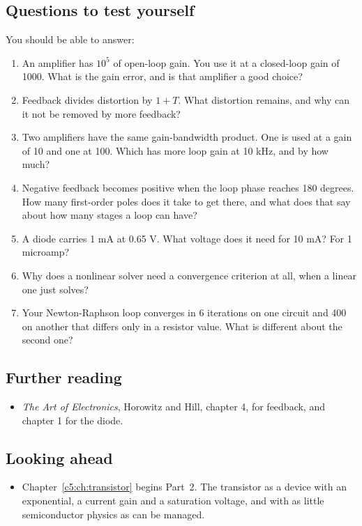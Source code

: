 \subsection*{Questions to test yourself}
You should be able to answer:
\begin{enumerate}
  \item An amplifier has $10^5$ of open-loop gain. You use it at a closed-loop gain of 1000. What is the gain error, and is that amplifier a good choice?
  \item Feedback divides distortion by $1 + T$. What distortion remains, and why can it not be removed by more feedback?
  \item Two amplifiers have the same gain-bandwidth product. One is used at a gain of 10 and one at 100. Which has more loop gain at 10 kHz, and by how much?
  \item Negative feedback becomes positive when the loop phase reaches 180 degrees. How many first-order poles does it take to get there, and what does that say about how many stages a loop can have?
  \item A diode carries 1 mA at 0.65 V. What voltage does it need for 10 mA? For 1 microamp?
  \item Why does a nonlinear solver need a convergence criterion at all, when a linear one just solves?
  \item Your Newton-Raphson loop converges in 6 iterations on one circuit and 400 on another that differs only in a resistor value. What is different about the second one?
\end{enumerate}

\subsection*{Further reading}
\begin{itemize}
  \item \emph{The Art of Electronics}, Horowitz and Hill, chapter 4, for feedback, and chapter 1 for the diode.
\end{itemize}

\subsection*{Looking ahead}
\begin{itemize}
  \item Chapter~\ref{c5:ch:transistor} begins Part~2. The transistor as a device with an exponential, a current gain and a saturation voltage, and with as little semiconductor physics as can be managed.
\end{itemize}

